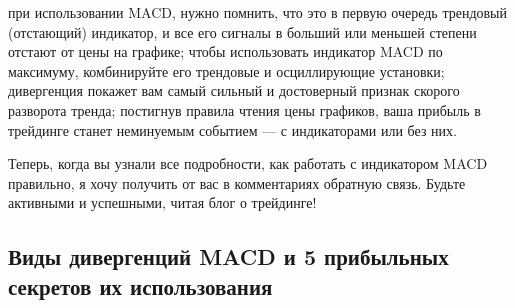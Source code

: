 \documentclass[a5paper]{article}
\begin{document}
    при использовании MACD, нужно помнить, что это в первую очередь трендовый (отстающий) индикатор, и все его сигналы в больший или меньшей степени отстают от цены на графике;
    чтобы использовать индикатор MACD по максимуму, комбинируйте его трендовые и осциллирующие установки;
    дивергенция покажет вам самый сильный и достоверный признак скорого разворота тренда;
    постигнув правила чтения цены графиков, ваша прибыль в трейдинге станет неминуемым событием — с индикаторами или без них.

Теперь, когда вы узнали все подробности, как работать с индикатором MACD правильно, я хочу получить от вас в комментариях обратную связь. Будьте активными и успешными, читая блог о трейдинге!

\subsection{Виды дивергенций MACD и 5 прибыльных секретов их
  использования}



\end{document}
